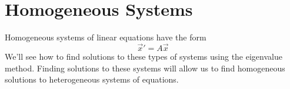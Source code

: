 \section{Homogeneous Systems}
\noindent
Homogeneous systems of linear equations have the form
\begin{equation*}
	\vec{x}' = A\vec{x}
\end{equation*}
We'll see how to find solutions to these types of systems using the eigenvalue method. Finding solutions to these systems will allow us to find homogeneous solutions to heterogeneous systems of equations.

